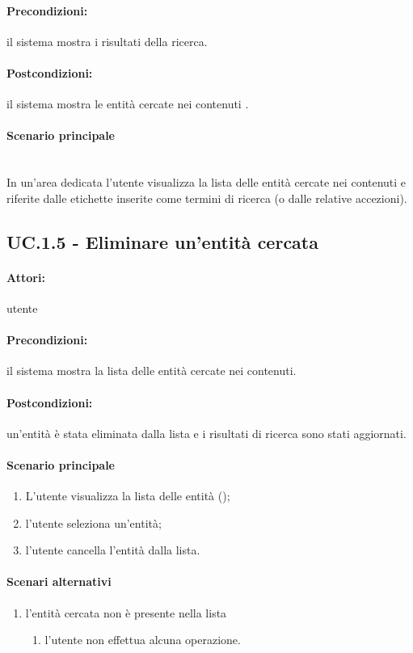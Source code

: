 \documentclass[10pt,a4paper,headinclude,footinclude,hidelinks]{scrreprt} %
\begin{document}
	\paragraph{Precondizioni:} il sistema mostra i risultati della ricerca.
	\paragraph{Postcondizioni:} il sistema mostra le entità cercate nei contenuti .
	\paragraph{Scenario principale} \hfill \\
	In un'area dedicata l'utente visualizza la lista delle entità cercate nei contenuti e riferite dalle etichette inserite come termini di ricerca (o dalle relative accezioni).

	\subsection[UC.1.5]{UC.1.5 - Eliminare un'entità cercata}
	\label{sec:stage:ar:uc:1_5}
	\paragraph{Attori:} utente
	\paragraph{Precondizioni:} il sistema mostra la lista delle entità cercate nei contenuti.
	\paragraph{Postcondizioni:} un'entità è stata eliminata dalla lista e i risultati di ricerca sono stati aggiornati.
	\paragraph{Scenario principale}
	\begin{enumerate}
	\item L'utente visualizza la lista delle entità ();
	\item l'utente seleziona un'entità;
	\item l'utente cancella l'entità dalla lista.
	\end{enumerate}
	\paragraph{Scenari alternativi}
	\begin{enumerate}
	\item l'entità cercata non è presente nella lista
		\begin{enumerate}
		\item l'utente non effettua alcuna operazione.
		\end{enumerate}
	\end{enumerate}
\end{document}
